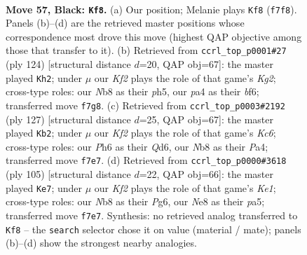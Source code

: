 \documentclass[11pt]{article}
\begin{document}
\clearpage

\begin{figure}[p]\centering
\begin{subfigure}{0.46\textwidth}\centering
\resizebox{\linewidth}{!}{%
\newchessgame
\chessboard[
  setfen={1n2n3/5k2/7p/7Q/P7/7K/3N4/q7 b - - 14 57},
  showmover=false,
  pgfstyle=straightmove, color=movearrow, markmove={f7-f8}
]}
\caption{}
\end{subfigure}\hfill
\begin{subfigure}{0.46\textwidth}\centering
\resizebox{\linewidth}{!}{%
\newchessgame
\chessboard[
  setfen={8/5Q2/5b1k/7p/4q3/8/5PK1/5N2 w - - 1 63},
  showmover=false,
  pgfstyle=straightmove, color=movearrow, markmove={g2-h2}
]}
\caption{}
\end{subfigure}
\\[4pt]
\begin{subfigure}{0.46\textwidth}\centering
\resizebox{\linewidth}{!}{%
\newchessgame
\chessboard[
  setfen={8/8/3q4/8/p7/2k1QP2/7P/4K3 b - - 3 64},
  showmover=false,
  pgfstyle=straightmove, color=movearrow, markmove={c3-b2}
]}
\caption{}
\end{subfigure}\hfill
\begin{subfigure}{0.46\textwidth}\centering
\resizebox{\linewidth}{!}{%
\newchessgame
\chessboard[
  setfen={2Q1k3/8/p5p1/P7/1P1q4/7K/8/8 b - - 2 53},
  showmover=false,
  pgfstyle=straightmove, color=movearrow, markmove={e8-e7}
]}
\caption{}
\end{subfigure}
\caption{\textbf{Move 57, Black: \texttt{Kf8}.} (a) Our position; Melanie plays \texttt{Kf8} (\texttt{f7f8}). Panels (b)--(d) are the retrieved master positions whose correspondence most drove this move (highest QAP objective among those that transfer to it). (b) Retrieved from \texttt{ccrl\_top\_p0001\#27} (ply 124) [structural distance $d$=20, QAP obj=67]: the master played \texttt{Kh2}; under $\mu$ our \emph{Kf2} plays the role of that game's \emph{Kg2}; cross-type roles: our \emph{N}b8 as their \emph{p}h5, our \emph{p}a4 as their \emph{b}f6; transferred move \texttt{f7g8}. (c) Retrieved from \texttt{ccrl\_top\_p0003\#2192} (ply 127) [structural distance $d$=25, QAP obj=67]: the master played \texttt{Kb2}; under $\mu$ our \emph{Kf2} plays the role of that game's \emph{Kc6}; cross-type roles: our \emph{P}h6 as their \emph{Q}d6, our \emph{N}b8 as their \emph{P}a4; transferred move \texttt{f7e7}. (d) Retrieved from \texttt{ccrl\_top\_p0000\#3618} (ply 105) [structural distance $d$=22, QAP obj=66]: the master played \texttt{Ke7}; under $\mu$ our \emph{Kf2} plays the role of that game's \emph{Ke1}; cross-type roles: our \emph{N}b8 as their \emph{P}g6, our \emph{N}e8 as their \emph{p}a5; transferred move \texttt{f7e7}. Synthesis: no retrieved analog transferred to \texttt{Kf8} -- the \texttt{search} selector chose it on value (material / mate); panels (b)--(d) show the strongest nearby analogies.}
\label{fig:thought-m113}
\end{figure}
\end{document}
